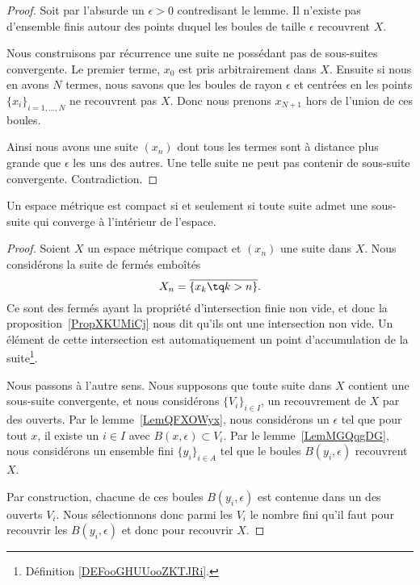 \begin{proof}
    Soit par l'absurde un \( \epsilon>0\) contredisant le lemme. Il n'existe pas d'ensemble finis autour des points duquel les boules de taille \( \epsilon\) recouvrent \( X\).

    Nous construisons par récurrence une suite ne possédant pas de sous-suites convergente. Le premier terme, \( x_0\) est pris arbitrairement dans \( X\). Ensuite si nous en avons \( N\) termes, nous savons que les boules de rayon \( \epsilon\) et centrées en les points \( \{ x_i \}_{i=1,\ldots, N}\) ne recouvrent pas \( X\). Donc nous prenons \( x_{N+1}\) hors de l'union de ces boules.

    Ainsi nous avons une suite \( (x_n)\) dont tous les termes sont à distance plus grande que \( \epsilon\) les uns des autres. Une telle suite ne peut pas contenir de sous-suite convergente. Contradiction.
\end{proof}

\begin{theorem}\label{ThoBWFTXAZNH}
    Un espace métrique est compact si et seulement si toute suite admet une sous-suite qui converge à l'intérieur de l'espace.
\end{theorem}

\begin{proof}
   Soient \( X\) un espace métrique compact et \( (x_n)\) une suite dans \( X\). Nous considérons la suite de fermés emboîtés
   \begin{equation}
       X_n=\overline{ \{ x_k\tq k>n \} }.
   \end{equation}
   Ce sont des fermés ayant la propriété d'intersection finie non vide, et donc la proposition~\ref{PropXKUMiCj} nous dit qu'ils ont une intersection non vide. Un élément de cette intersection est automatiquement un point d'accumulation de la suite\footnote{Définition \ref{DEFooGHUUooZKTJRi}.}.

   Nous passons à l'autre sens. Nous supposons que toute suite dans \( X\) contient une sous-suite convergente, et nous considérons \( \{ V_i \}_{i\in I}\), un recouvrement de \( X\) par des ouverts. Par le lemme~\ref{LemQFXOWyx}, nous considérons un \( \epsilon\) tel que pour tout \( x\), il existe un \( i\in I\) avec \( B(x,\epsilon)\subset V_i\). Par le lemme~\ref{LemMGQqgDG}, nous considérons un ensemble fini \( \{ y_i \}_{i\in A}\) tel que le boules \( B(y_i,\epsilon)\) recouvrent \( X\).

   Par construction, chacune de ces boules \( B(y_i,\epsilon)\) est contenue dans un des ouverts \( V_i\). Nous sélectionnons donc parmi les \( V_i\) le nombre fini qu'il faut pour recouvrir les \( B(y_i,\epsilon)\) et donc pour recouvrir \( X\).
\end{proof}


